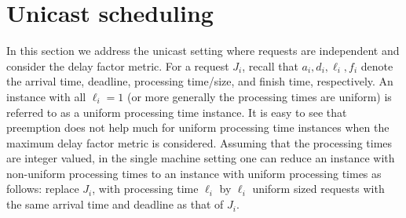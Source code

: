 \section{Unicast scheduling}
\label{sec:unicast} In this section we address the unicast setting
where requests are independent and consider the delay factor metric.
For a request $J_i$, recall that $a_i,d_i,\ell_i,f_i$ denote the
arrival time, deadline, processing time/size, and finish time,
respectively. An instance with all $\ell_i = 1$ (or more generally
the processing times are uniform) is referred to as a uniform
processing time instance. It is easy to see that preemption does not
help much for uniform processing time instances when the maximum
delay factor metric is considered. Assuming that the processing
times are integer valued, in the single machine setting one can
reduce an instance with non-uniform processing times to an instance
with uniform processing times as follows:  replace $J_i$, with
processing time $\ell_i$ by $\ell_i$ uniform sized requests with
the same arrival time and deadline as that of $J_i$.
